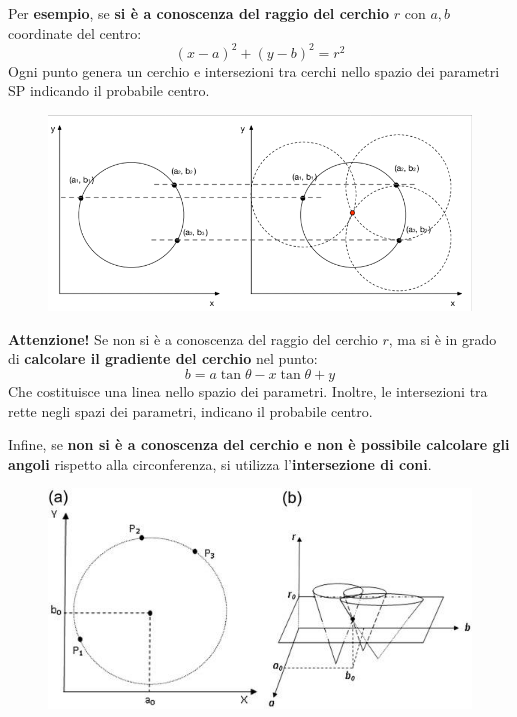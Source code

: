 \documentclass[a4paper]{article}
\begin{document}
	\noindent
	Per \textcolor{Green4}{\textbf{esempio}}, se \textbf{si è a conoscenza del raggio del cerchio} $r$ con $a,b$ coordinate del centro:
	\begin{equation*}
		\left(x-a\right)^{2} + \left(y-b\right)^{2} = r^{2}
	\end{equation*}
	Ogni punto genera un cerchio e intersezioni tra cerchi nello spazio dei parametri SP indicando il probabile centro.
	\begin{figure}[!htp]
		\centering
		\includegraphics[width=\textwidth]{img/trasformata_hough_cerchio.png}
	\end{figure}
	
	\noindent
	\textcolor{Green4}{\textbf{Attenzione!}} Se non si è a conoscenza del raggio del cerchio $r$, ma si è in grado di \textbf{calcolare il gradiente del cerchio} nel punto:
	\begin{equation*}
		b = a \tan\theta - x \tan\theta + y
	\end{equation*}
	Che costituisce una linea nello spazio dei parametri. Inoltre, le intersezioni tra rette negli spazi dei parametri, indicano il probabile centro.\newpage
	
	\noindent
	Infine, se \textbf{non si è a conoscenza del cerchio e non è possibile calcolare gli angoli} rispetto alla circonferenza, si utilizza l'\textbf{intersezione di coni}.
	\begin{figure}[!htp]
		\centering
		\includegraphics[width=.9\textwidth]{img/trasformata_hough_coni.png}
	\end{figure}
\end{document}
